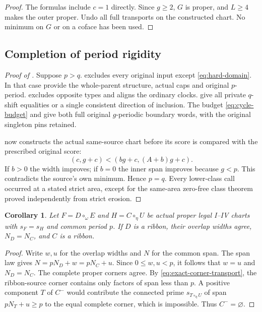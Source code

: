 \documentclass[11pt,a4paper]{amsart}
\numberwithin{equation}{section}
\theoremstyle{plain}
\newtheorem{corollary}[theorem]{Corollary}
\theoremstyle{definition}
\begin{document}
\begin{proof}
The formulas include \(c=1\) directly.  Since \(g\ge2\), \(G\) is proper, and
\(L\ge4\) makes the outer proper.  Undo all full transports on the constructed
chart.  No minimum on \(G\) or on a coface has been used.
\end{proof}


\subsection{Completion of period rigidity}

\begin{proof}[Proof of ]
Suppose \(p>q\).   excludes every original input except
\eqref{eq:hard-domain}.  In that case 
provide the whole-parent structure, actual caps and original \(p\)-period.
 excludes opposite types and aligns the ordinary clocks.
 give all private \(q\)-shift
equalities or a single consistent direction of inclusion.  The budget
\eqref{eq:cycle-budget} and  give both full original
\(g\)-periodic boundary words, with the original singleton pins retained.

 now constructs the actual same-source chart before its
score is compared with the prescribed original score:
\[
 (c,g+c)<(bg+c,(A+b)g+c).
\]
If \(b>0\) the width improves; if \(b=0\) the inner span improves because
\(g<p\).  This contradicts the source's own minimum.  Hence \(p=q\).
Every lower-class call occurred at a stated strict area, except for the
same-area zero-free class theorem proved independently from strict erosion.
\end{proof}

\begin{corollary}\label{cor:equal-width-ribbon}
Let \(F=D\circ_\omega E\) and \(H=C\circ_\eta U\) be actual proper legal
I--IV charts with \(s_F=s_H\) and common period \(p\).  If \(D\) is a
ribbon, their overlap widths agree, \(N_D=N_C\), and \(C\) is a ribbon.
\end{corollary}
\begin{proof}
Write \(w,u\) for the overlap widths and \(N\) for the common span.
The span law gives \(N=pN_D+w=pN_C+u\).
Since \(0\le w,u<p\), it follows that \(w=u\) and \(N_D=N_C\).
The complete proper corners agree.  By \eqref{eq:exact-corner-transport},
the ribbon-source corner contains only factors of span less than \(p\).
A positive component \(T\) of \(C^-\) would contribute the connected prime
\(s_{T\circ_\eta U}\) of span \(pN_T+u\ge p\) to the equal complete corner,
which is impossible.  Thus \(C^-=\varnothing\).
\end{proof}
\end{document}
